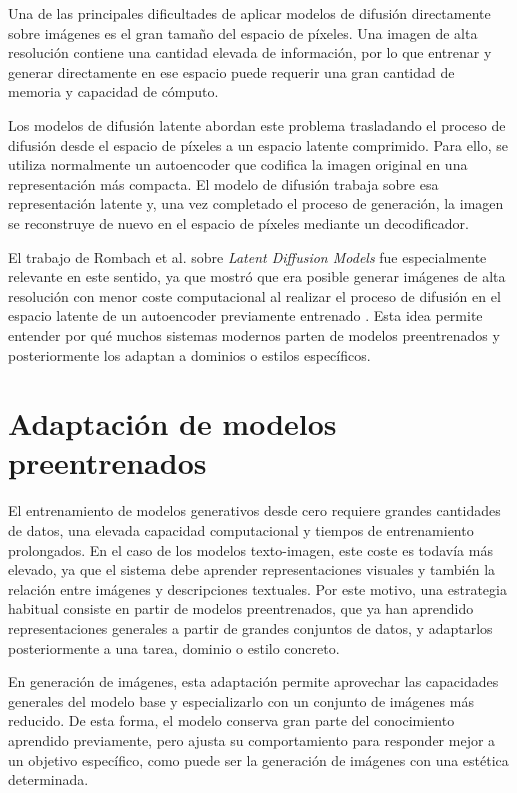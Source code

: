 \documentclass[a4paper,11pt,titlepage]{scrbook}
\begin{document}
Una de las principales dificultades de aplicar modelos de difusión directamente sobre imágenes es el gran tamaño del espacio de píxeles. Una imagen de alta resolución contiene una cantidad elevada de información, por lo que entrenar y generar directamente en ese espacio puede requerir una gran cantidad de memoria y capacidad de cómputo.

\medskip

Los modelos de difusión latente abordan este problema trasladando el proceso de difusión desde el espacio de píxeles a un espacio latente comprimido. Para ello, se utiliza normalmente un autoencoder que codifica la imagen original en una representación más compacta. El modelo de difusión trabaja sobre esa representación latente y, una vez completado el proceso de generación, la imagen se reconstruye de nuevo en el espacio de píxeles mediante un decodificador.

\medskip

El trabajo de Rombach et al. sobre \textit{Latent Diffusion Models} fue especialmente relevante en este sentido, ya que mostró que era posible generar imágenes de alta resolución con menor coste computacional al realizar el proceso de difusión en el espacio latente de un autoencoder previamente entrenado \cite{rombach2022high}. Esta idea permite entender por qué muchos sistemas modernos parten de modelos preentrenados y posteriormente los adaptan a dominios o estilos específicos.

\section{Adaptación de modelos preentrenados}

El entrenamiento de modelos generativos desde cero requiere grandes cantidades de datos, una elevada capacidad computacional y tiempos de entrenamiento prolongados. En el caso de los modelos texto-imagen, este coste es todavía más elevado, ya que el sistema debe aprender representaciones visuales y también la relación entre imágenes y descripciones textuales. Por este motivo, una estrategia habitual consiste en partir de modelos preentrenados, que ya han aprendido representaciones generales a partir de grandes conjuntos de datos, y adaptarlos posteriormente a una tarea, dominio o estilo concreto.

\medskip

En generación de imágenes, esta adaptación permite aprovechar las capacidades generales del modelo base y especializarlo con un conjunto de imágenes más reducido. De esta forma, el modelo conserva gran parte del conocimiento aprendido previamente, pero ajusta su comportamiento para responder mejor a un objetivo específico, como puede ser la generación de imágenes con una estética determinada.
\end{document}
